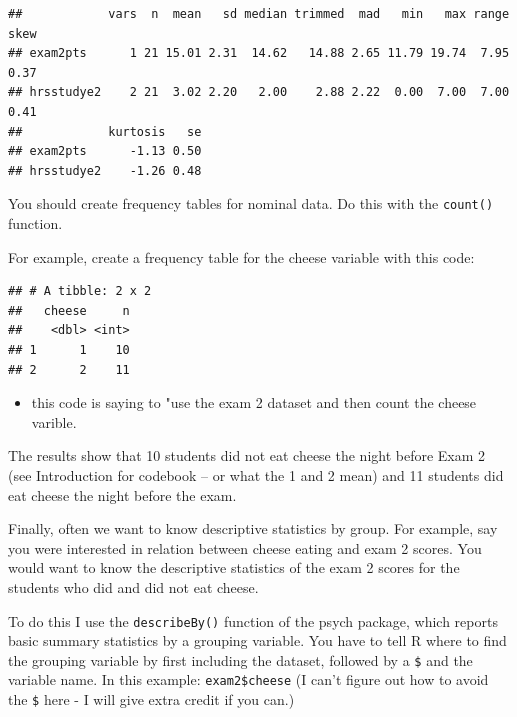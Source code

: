 \documentclass[
]{book}
\newenvironment{Shaded}{\begin{snugshade}}{\end{snugshade}}
\newcommand{\KeywordTok}[1]{\textcolor[rgb]{0.13,0.29,0.53}{\textbf{#1}}}
\newcommand{\NormalTok}[1]{#1}
\newcommand{\OperatorTok}[1]{\textcolor[rgb]{0.81,0.36,0.00}{\textbf{#1}}}
\newcommand{\StringTok}[1]{\textcolor[rgb]{0.31,0.60,0.02}{#1}}
\providecommand{\tightlist}{%
  \setlength{\itemsep}{0pt}\setlength{\parskip}{0pt}}
\begin{document}
\begin{verbatim}
##            vars  n  mean   sd median trimmed  mad   min   max range skew
## exam2pts      1 21 15.01 2.31  14.62   14.88 2.65 11.79 19.74  7.95 0.37
## hrsstudye2    2 21  3.02 2.20   2.00    2.88 2.22  0.00  7.00  7.00 0.41
##            kurtosis   se
## exam2pts      -1.13 0.50
## hrsstudye2    -1.26 0.48
\end{verbatim}

You should create frequency tables for nominal data. Do this with the \texttt{count()} function.

For example, create a frequency table for the cheese variable with this code:

\begin{Shaded}
\end{Shaded}

\begin{verbatim}
## # A tibble: 2 x 2
##   cheese     n
##    <dbl> <int>
## 1      1    10
## 2      2    11
\end{verbatim}

\begin{itemize}
\tightlist
\item
  this code is saying to "use the exam 2 dataset and then count the cheese varible.
\end{itemize}

The results show that 10 students did not eat cheese the night before Exam 2 (see Introduction for codebook -- or what the 1 and 2 mean) and 11 students did eat cheese the night before the exam.

Finally, often we want to know descriptive statistics by group. For example, say you were interested in relation between cheese eating and exam 2 scores. You would want to know the descriptive statistics of the exam 2 scores for the students who did and did not eat cheese.

To do this I use the \texttt{describeBy()} function of the psych package, which reports basic summary statistics by a grouping variable. You have to tell R where to find the grouping variable by first including the dataset, followed by a \texttt{\$} and the variable name. In this example: \texttt{exam2\$cheese} (I can't figure out how to avoid the \texttt{\$} here - I will give extra credit if you can.)
\end{document}
